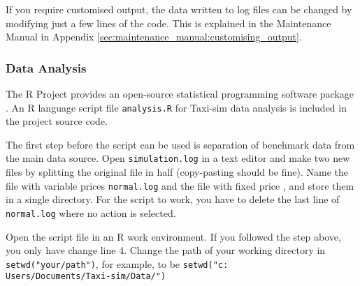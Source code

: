 If you require customised output, the data written to log files can be changed
by modifying just a few lines of the code. This is explained in the Maintenance
Manual in Appendix \ref{sec:maintenance_manual:customising_output}.


\subsubsection{Data Analysis}
\label{sec:user_manual:using:output}


The R Project provides an open-source statistical programming software package
\parencite{Rlang}. An R language script file \texttt{analysis.R} for Taxi-sim
data analysis is included in the project source code. 

The first step before the script can be used is separation of benchmark data
from the main data source. Open \texttt{simulation.log} in a text editor and
make two new files by splitting the original file in half (copy-pasting should
be fine). Name the file with variable prices \texttt{normal.log} and the file
with fixed price , and store them in a single directory.
For the script to work, you have to delete the last line of \texttt{normal.log}
where no action is selected.

Open the script file in an R work environment. If you followed the step above,
you only have change line 4. Change the path of your working directory in
\texttt{setwd("your/path")}, for example, to be
\texttt{setwd("c:\\Users/Documents/Taxi-sim/Data/")}

